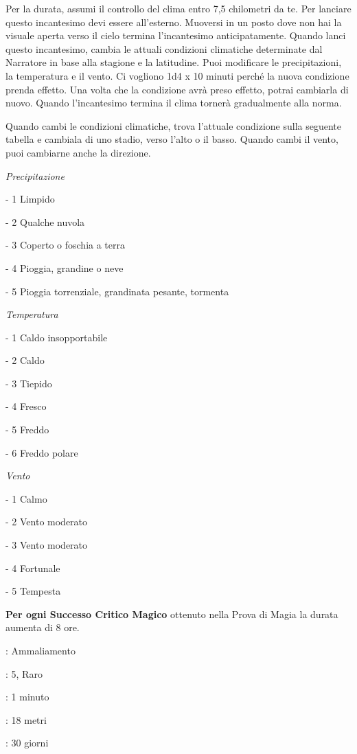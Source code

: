\begin{multicols}{2}
Per la durata, assumi il controllo del clima entro 7,5 chilometri da te. Per lanciare questo incantesimo devi essere all'esterno. Muoversi in un posto dove non hai la visuale aperta verso il cielo termina l'incantesimo anticipatamente. Quando lanci questo incantesimo, cambia le attuali condizioni climatiche determinate dal Narratore in base alla stagione e la latitudine. Puoi modificare le precipitazioni, la temperatura e il vento. Ci vogliono 1d4 x 10 minuti perché la nuova condizione prenda effetto. Una volta che la condizione avrà preso effetto, potrai cambiarla di nuovo. Quando l'incantesimo termina il clima tornerà gradualmente alla norma.

\medskip

Quando cambi le condizioni climatiche, trova l'attuale condizione sulla seguente tabella e cambiala di uno stadio, verso l'alto o il basso. Quando cambi il vento, puoi cambiarne anche la direzione.

\medskip

\emph{Precipitazione}

- 1 Limpido

- 2 Qualche nuvola

- 3 Coperto o foschia a terra

- 4 Pioggia, grandine o neve

- 5 Pioggia torrenziale, grandinata pesante, tormenta

\medskip

\emph{Temperatura}

- 1 Caldo insopportabile

- 2 Caldo

- 3 Tiepido

- 4 Fresco

- 5 Freddo

- 6 Freddo polare

\medskip

\emph{Vento}

- 1 Calmo

- 2 Vento moderato

- 3 Vento moderato

- 4 Fortunale

- 5 Tempesta

\medskip

\textbf{Per ogni Successo Critico Magico} ottenuto nella Prova di Magia la durata aumenta di 8 ore.

\noindent\colorbox{OBSSgold!10}{
\begin{minipage}{0.95\linewidth}
\begin{description}[noitemsep, topsep=0pt, parsep=0pt, partopsep=0pt, leftmargin=0cm, labelwidth=1.3cm]
	\item[\textbf{Lista}]: Ammaliamento
	\item[\textbf{Livello}]: 5, Raro
	\item[\textbf{Lancio}]: 1 minuto
	\item[\textbf{Gittata}]: 18 metri
	\item[\textbf{Durata}]: 30 giorni
\end{description}
\end{minipage}}\smallskip


\end{multicols}
